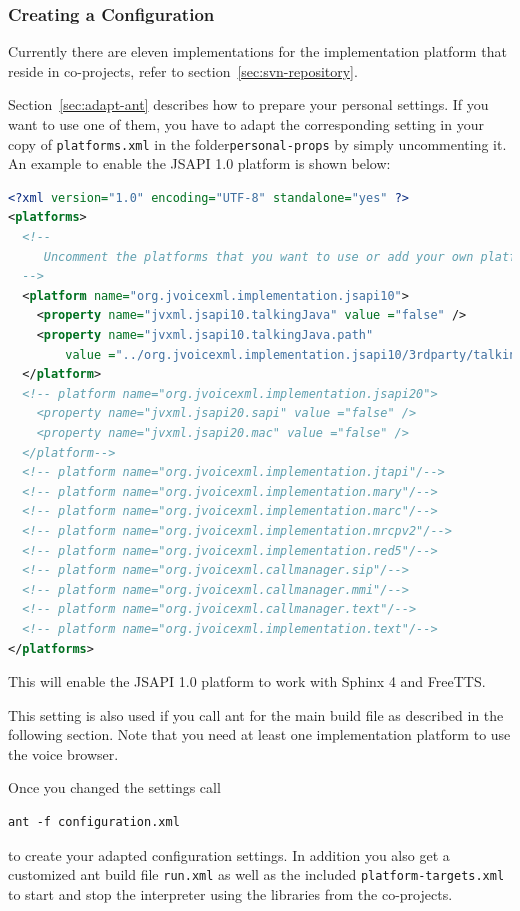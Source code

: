 \documentclass[11pt,a4paper]{article}
\begin{document}
\subsubsection{Creating a Configuration}
\label{sec:create-configuration}

Currently there are eleven implementations for the implementation platform
that reside in co-projects, refer to section~\ref{sec:svn-repository}.

Section~\ref{sec:adapt-ant} describes how to prepare your personal settings.
If you want to use one of them, you have to adapt the corresponding setting in
your copy of \texttt{platforms.xml} in the folder\texttt{personal-props} by
simply uncommenting it.
An example to enable the JSAPI 1.0 platform is shown below:
\begin{lstlisting}[language=XML]
<?xml version="1.0" encoding="UTF-8" standalone="yes" ?>
<platforms>
  <!--
     Uncomment the platforms that you want to use or add your own platform.
  -->
  <platform name="org.jvoicexml.implementation.jsapi10">
    <property name="jvxml.jsapi10.talkingJava" value ="false" />
    <property name="jvxml.jsapi10.talkingJava.path"
        value ="../org.jvoicexml.implementation.jsapi10/3rdparty/talkingjava/lib" />
  </platform>
  <!-- platform name="org.jvoicexml.implementation.jsapi20">
    <property name="jvxml.jsapi20.sapi" value ="false" />
    <property name="jvxml.jsapi20.mac" value ="false" />
  </platform-->
  <!-- platform name="org.jvoicexml.implementation.jtapi"/-->
  <!-- platform name="org.jvoicexml.implementation.mary"/-->
  <!-- platform name="org.jvoicexml.implementation.marc"/-->
  <!-- platform name="org.jvoicexml.implementation.mrcpv2"/-->
  <!-- platform name="org.jvoicexml.implementation.red5"/-->
  <!-- platform name="org.jvoicexml.callmanager.sip"/-->
  <!-- platform name="org.jvoicexml.callmanager.mmi"/-->
  <!-- platform name="org.jvoicexml.callmanager.text"/-->
  <!-- platform name="org.jvoicexml.implementation.text"/-->
</platforms>
\end{lstlisting}

This will enable the JSAPI 1.0 platform to work with Sphinx 4 and FreeTTS. 


This setting is also used if you call ant for the main build file as described
in the following section.
Note that you need at least one implementation platform to use the voice
browser.

Once you changed the settings call
\begin{lstlisting}
ant -f configuration.xml
\end{lstlisting}
to create your adapted configuration settings. In addition you also get
a customized ant build file \texttt{run.xml} as well as the included
\texttt{platform-targets.xml} to start and
stop the interpreter using the libraries from the co-projects.
\end{document}
